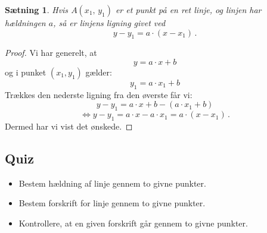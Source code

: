 \documentclass[12pt,oneside,a4paper]{article}
\newtheorem{thm}{Sætning}[section]
\begin{document}
\begin{tcolorbox}
\begin{thm}
    Hvis $A(x_1,\,y_1)$ er et punkt på en ret linje, og linjen har hældningen
    $a$, så er linjens ligning givet ved
    \[
    y - y_1 = a\cdot (x-x_1) \,.
    \]
\end{thm}
\end{tcolorbox}
\begin{proof}
    Vi har generelt, at 
    \[
    y = a\cdot x + b
    \]
    og i punket $(x_1, y_1)$ gælder:
    \[
    y_1 = a\cdot x_1 + b
    \]
    Trækkes den nederste ligning fra den øverste får vi:
    \[
    y-y_1 = a \cdot x + b - (a \cdot x_1 + b)
    \]
    \[
    \Leftrightarrow y-y_1 = a \cdot x - a \cdot x_1 = a\cdot (x - x_1) \,.
    \]
    Dermed har vi vist det ønskede.
\end{proof}

\subsection{Quiz}
\begin{itemize}
    \item Bestem hældning af linje gennem to givne punkter.
    \item Bestem forskrift for linje gennem to givne punkter.
    \item Kontrollere, at en given forskrift går gennem to givne punkter.
\end{itemize}
\end{document}
